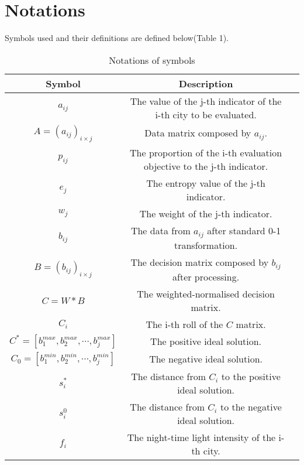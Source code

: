 \section{Notations}
Symbols used and their definitions are defined below(Table 1).
\begin{table}[H] \centering
    \caption{Notations of symbols}
    \begin{tabular}{ccl}
        \toprule
        Symbol & Description\\ \hline
        $a_{ij}$ & The value of the j-th indicator of the i-th city to be evaluated. \\
        $A=(a_{ij})_{i\times j}$ & Data matrix composed by $a_{ij}$. \\
        $p_{ij}$ & The proportion of the i-th evaluation objective to the j-th indicator. \\
        $e_j$ & The entropy value of the j-th indicator. \\
        $w_j$ & The weight of the j-th indicator. \\
        $b_{ij}$ & The data from $a_{ij}$ after standard 0-1 transformation.\\
        $B=(b_{ij})_{i\times j}$ & The decision matrix composed by $b_{ij}$ after processing.\\
        $C=W*B$ & The weighted-normalised decision matrix. \\
        $C_i$ & The i-th roll of the $C$ matrix. \\
        $C^*=[b_1^{max},b_2^{max},\cdots,b_j^{max}]$ & The positive ideal solution. \\
        $C_0=[b_1^{min},b_2^{min},\cdots,b_j^{min}]$ & The negative ideal solution. \\
        $s_i^*$ & The distance from $C_i$ to the positive ideal solution. \\
        $s_i^0$ & The distance from $C_i$ to the negative ideal solution. \\
        $f_i$ & The night-time light intensity of the i-th city. \\
        \bottomrule
    \end{tabular}
\end{table}